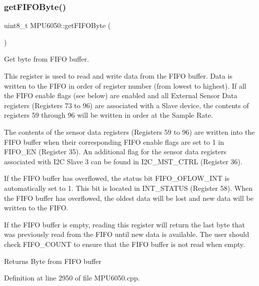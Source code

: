 \mbox{\label{classMPU6050_a7733011d30d5b64564f6b5422d8639ae}} 
\subsubsection{\texorpdfstring{getFIFOByte()}{getFIFOByte()}}
{\footnotesize\ttfamily uint8\+\_\+t M\+P\+U6050\+::get\+F\+I\+F\+O\+Byte (\begin{DoxyParamCaption}{ }\end{DoxyParamCaption})}



Get byte from F\+I\+FO buffer. 

This register is used to read and write data from the F\+I\+FO buffer. Data is written to the F\+I\+FO in order of register number (from lowest to highest). If all the F\+I\+FO enable flags (see below) are enabled and all External Sensor Data registers (Registers 73 to 96) are associated with a Slave device, the contents of registers 59 through 96 will be written in order at the Sample Rate.

The contents of the sensor data registers (Registers 59 to 96) are written into the F\+I\+FO buffer when their corresponding F\+I\+FO enable flags are set to 1 in F\+I\+F\+O\+\_\+\+EN (Register 35). An additional flag for the sensor data registers associated with I2C Slave 3 can be found in I2\+C\+\_\+\+M\+S\+T\+\_\+\+C\+T\+RL (Register 36).

If the F\+I\+FO buffer has overflowed, the status bit F\+I\+F\+O\+\_\+\+O\+F\+L\+O\+W\+\_\+\+I\+NT is automatically set to 1. This bit is located in I\+N\+T\+\_\+\+S\+T\+A\+T\+US (Register 58). When the F\+I\+FO buffer has overflowed, the oldest data will be lost and new data will be written to the F\+I\+FO.

If the F\+I\+FO buffer is empty, reading this register will return the last byte that was previously read from the F\+I\+FO until new data is available. The user should check F\+I\+F\+O\+\_\+\+C\+O\+U\+NT to ensure that the F\+I\+FO buffer is not read when empty.

\begin{DoxyReturn}{Returns}
Byte from F\+I\+FO buffer 
\end{DoxyReturn}


Definition at line 2950 of file M\+P\+U6050.\+cpp.

\mbox{\label{classMPU6050_ad96c7a75a39327ebaae01386bcbc58dd}} 
